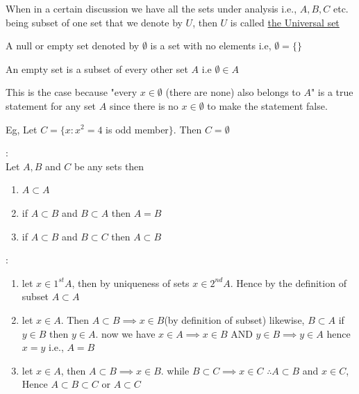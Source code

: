 \begin{para}
    When in a certain discussion we have all the sets under analysis i.e., $A,B,C$ etc. being subset of one set that we denote by $U$, then $U$ is called \underline{the Universal set}
\end{para}

\begin{para}
    A null or empty set denoted by $\emptyset$ is a set with no elements i.e, $\emptyset = \{\}$
\end{para}

\begin{para}
    An empty set is a subset of every other set $A$ i.e $\emptyset \in A$
\end{para}

\begin{para}
    This is the case because "every $x \in \emptyset$ (there are none) also belongs to $A$" is a true statement for any set $A$ since there is no $x \in \emptyset$ to make the statement false.
\end{para}

\begin{para}
    Eg, Let $C = \{x:x^2 = 4$ is odd member$\}$. Then $C = \emptyset$
\end{para}

\begin{theorem}
    :\\Let $A, B$ and $C$ be any sets then
    \begin{enumerate}
        \item $A \subset A$
        \item if $A \subset B$ and $B \subset A$ then $A = B$
        \item if $A \subset B$ and $B \subset C$ then $A \subset B$
    \end{enumerate}
\end{theorem}


\begin{proofs}
    :\\
    \begin{enumerate}
        \item let $x \in 1^{st} A$, then by uniqueness of sets $x \in 2^{nd} A$. Hence by the definition of subset $A \subset A$
        \item let $x \in A$. Then $A \subset B \implies x \in B$(by definition of subset) likewise, $B \subset A$ if $y \in B$ then $y \in A$. now we have $x \in A \implies x \in B$ AND $y \in B \implies y \in A$ hence $x = y$ i.e., $A = B$
        \item let $x \in A$, then $A \subset B \implies x \in B$. while $B \subset C \implies x \in C$ $\therefore A \subset B$ and $x \in C$, Hence $A \subset B \subset C$ or $A \subset C$
    \end{enumerate}
\end{proofs}
